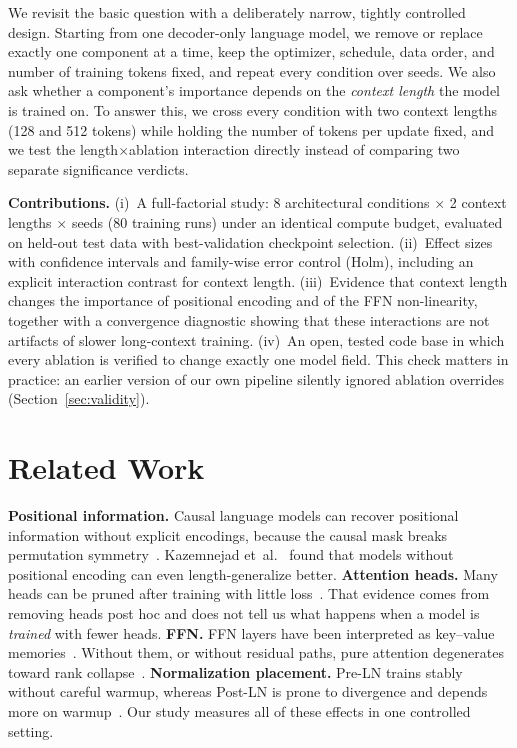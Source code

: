 \documentclass[conference]{IEEEtran}
\begin{document}
We revisit the basic question with a deliberately narrow, tightly controlled design. Starting from
one decoder-only language model, we remove or replace exactly one component at a time, keep the
optimizer, schedule, data order, and number of training tokens fixed, and repeat every condition
over \NSeeds{} seeds. We also ask whether a component's importance depends on the
\emph{context length} the model is trained on. To answer this, we cross every condition with two
context lengths (128 and 512 tokens) while holding the number of tokens per update fixed, and we
test the length$\times$ablation interaction directly instead of comparing two separate significance
verdicts.

\textbf{Contributions.}
(i)~A full-factorial study: 8 architectural conditions $\times$ 2 context lengths $\times$ \NSeeds{} seeds
(80 training runs) under an identical compute budget, evaluated on held-out test data with
best-validation checkpoint selection.
(ii)~Effect sizes with confidence intervals and family-wise error control (Holm), including an
explicit interaction contrast for context length.
(iii)~Evidence that context length changes the importance of positional encoding and of the
FFN non-linearity, together with a convergence diagnostic showing that these interactions are not
artifacts of slower long-context training.
(iv)~An open, tested code base in which every ablation is verified to change exactly one model
field. This check matters in practice: an earlier version of our own pipeline silently ignored
ablation overrides (Section~\ref{sec:validity}).

\section{Related Work}

\textbf{Positional information.} Causal language models can recover positional information
without explicit encodings, because the causal mask breaks permutation
symmetry~\cite{irie2019language,haviv2022transformer}. Kazemnejad et~al.~\cite{kazemnejad2023impact}
found that models without positional encoding can even length-generalize better.
\textbf{Attention heads.} Many heads can be pruned after training with little
loss~\cite{michel2019sixteen,voita2019analyzing}. That evidence comes from removing heads post hoc
and does not tell us what happens when a model is \emph{trained} with fewer heads.
\textbf{FFN.} FFN layers have been interpreted as key--value memories~\cite{geva2021transformer}.
Without them, or without residual paths, pure attention degenerates toward rank
collapse~\cite{dong2021attention}.
\textbf{Normalization placement.} Pre-LN trains stably without careful warmup, whereas Post-LN
is prone to divergence and depends more on warmup~\cite{xiong2020layer,liu2020understanding}.
Our study measures all of these effects in one controlled setting.
\end{document}
